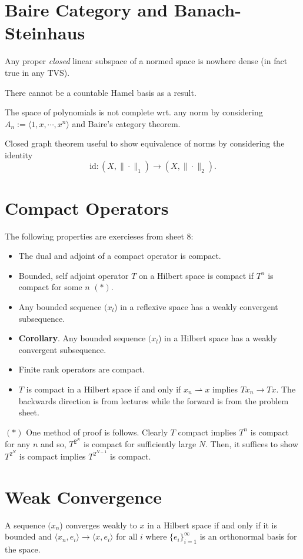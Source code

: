 \documentclass[]{article}
\theoremstyle{definition}
\begin{document}
\section*{Baire Category and Banach-Steinhaus}

Any proper \textit{closed} linear subspace of a normed space is nowhere dense 
(in fact true in any TVS).

There cannot be a countable Hamel basis as a result.

The space of polynomials is not complete wrt. any norm by considering \(A_n := \langle 1, x, \cdots, x^n\rangle\) 
and Baire's category theorem.

Closed graph theorem useful to show equivalence of norms by considering the 
identity 
\[\text{id} : (X, \|\cdot\|_1) \to (X, \|\cdot\|_2).\]

\section*{Compact Operators}

The following properties are exercieses from sheet 8:
\begin{itemize}
  \item The dual and adjoint of a compact operator is compact.
  \item Bounded, self adjoint operator \(T\) on a Hilbert space is compact if 
    \(T^n\) is compact for some \(n\) \((*)\).
  \item Any bounded sequence \((x_l\)) in a reflexive space has a weakly convergent subsequence.
  \item \textbf{Corollary}. Any bounded sequence \((x_l\)) in a Hilbert space has a weakly convergent subsequence.
  \item Finite rank operators are compact.
  \item \(T\) is compact in a Hilbert space if and only if \(x_n \rightharpoonup x\) implies \(Tx_n \to Tx\). 
    The backwards direction is from lectures while the forward is from the problem sheet.
\end{itemize}

\((*)\) One method of proof is follows. Clearly \(T\) compact implies \(T^n\) is 
compact for any \(n\) and so, \(T^{2^N}\) is compact for sufficiently large \(N\). 
Then, it suffices to show \(T^{2^N}\) is compact implies \(T^{2^{N - 1}}\) is 
compact.

\section*{Weak Convergence}

A sequence \((x_n\)) converges weakly to \(x\) in a Hilbert space if and only if it is bounded and 
\(\langle x_n, e_i \rangle \to \langle x, e_i\rangle\) for all \(i\) where \(\{e_i\}_{i = 1}^\infty\)
is an orthonormal basis for the space.
\end{document}
